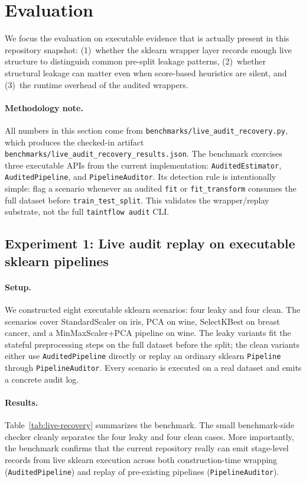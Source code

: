 \documentclass[11pt]{article}
\begin{document}
\section{Evaluation}\label{sec:eval}

We focus the evaluation on executable evidence that is actually present
in this repository snapshot:
(1)~whether the sklearn wrapper layer records enough live structure to
distinguish common pre-split leakage patterns,
(2)~whether structural leakage can matter even when score-based
heuristics are silent, and
(3)~the runtime overhead of the audited wrappers.

\paragraph{Methodology note.}
All numbers in this section come from
\texttt{benchmarks/live\_audit\_recovery.py}, which produces the
checked-in artifact
\texttt{benchmarks/live\_audit\_recovery\_results.json}.  The benchmark
exercises three executable APIs from the current implementation:
\texttt{AuditedEstimator}, \texttt{AuditedPipeline}, and
\texttt{PipelineAuditor}.  Its detection rule is intentionally simple:
flag a scenario whenever an audited \texttt{fit} or
\texttt{fit\_transform} consumes the full dataset before
\texttt{train\_test\_split}.  This validates the wrapper/replay
substrate, not the full \texttt{taintflow audit} CLI.

\subsection{Experiment 1: Live audit replay on executable sklearn pipelines}

\paragraph{Setup.}
We constructed eight executable sklearn scenarios: four leaky and four
clean.  The scenarios cover StandardScaler on iris, PCA on wine,
SelectKBest on breast cancer, and a MinMaxScaler+PCA pipeline on wine.
The leaky variants fit the stateful preprocessing steps on the full
dataset before the split; the clean variants either use
\texttt{AuditedPipeline} directly or replay an ordinary sklearn
\texttt{Pipeline} through \texttt{PipelineAuditor}.  Every scenario is
executed on a real dataset and emits a concrete audit log.

\paragraph{Results.}
Table~\ref{tab:live-recovery} summarizes the benchmark.  The small
benchmark-side checker cleanly separates the four leaky and four clean
cases.  More importantly, the benchmark confirms that the current
repository really can emit stage-level records from live sklearn
execution across both construction-time wrapping
(\texttt{AuditedPipeline}) and replay of pre-existing pipelines
(\texttt{PipelineAuditor}).
\end{document}
